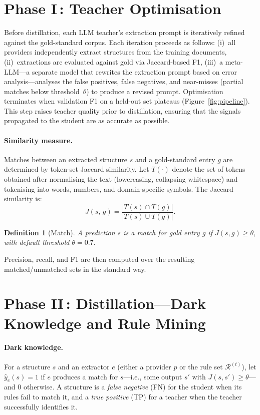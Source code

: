 \documentclass[11pt]{article}
\newtheorem{definition}{Definition}
\begin{document}
\section*{Phase I\,: Teacher Optimisation}

Before distillation, each LLM teacher's extraction prompt is iteratively refined against the
gold-standard corpus. Each iteration proceeds as follows: (i)~all providers independently extract
structures from the training documents, (ii)~extractions are evaluated against gold via
Jaccard-based F1, (iii)~a meta-LLM---a separate model that rewrites the extraction prompt
based on error analysis---analyses the false positives, false negatives, and
near-misses (partial matches below threshold~$\theta$) to produce a revised prompt.
Optimisation terminates when validation F1 on a held-out set plateaus
(Figure~\ref{fig:pipeline}). This step raises teacher quality prior to distillation,
ensuring that the signals propagated to the student are as accurate as possible.

\paragraph{Similarity measure.}
Matches between an extracted structure $s$ and a gold-standard entry $g$ are determined by
token-set Jaccard similarity. Let $T(\cdot)$ denote the set of tokens obtained after
normalising the text (lowercasing, collapsing whitespace) and tokenising into words, numbers,
and domain-specific symbols. The Jaccard similarity is:
%
\begin{equation}
  J(s,\, g)
    = \frac{\bigl|T(s) \cap T(g)\bigr|}{\bigl|T(s) \cup T(g)\bigr|}.
  \label{eq:jaccard}
\end{equation}
%
\begin{definition}[Match]
  A prediction $s$ is a \emph{match} for gold entry $g$ if $J(s, g) \geq \theta$, with
  default threshold $\theta = 0.7$.
\end{definition}
Precision, recall, and F1 are then computed over the resulting matched/unmatched sets in
the standard way.

\section*{Phase II\,: Distillation---Dark Knowledge and Rule Mining}

\paragraph{Dark knowledge.}
For a structure $s$ and an extractor $e$ (either a provider $p$ or the rule set
$\mathcal{R}^{(t)}$), let $\hat{y}_{e}(s) = 1$ if $e$ produces a match for $s$---i.e., some
output $s'$ with $J(s,s') \geq \theta$---and $0$ otherwise.
A structure is a \emph{false negative} (FN) for the student when its rules fail to match it,
and a \emph{true positive} (TP) for a teacher when the teacher successfully identifies it.
\end{document}

